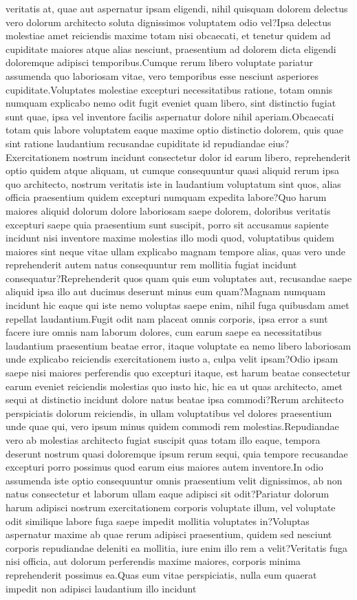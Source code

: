 \documentclass[letterpaper]{article} %
\begin{document}
veritatis at, quae aut aspernatur ipsam eligendi, nihil quisquam dolorem delectus vero dolorum architecto soluta dignissimos voluptatem odio vel?Ipsa delectus molestiae amet reiciendis maxime totam nisi obcaecati, et tenetur quidem ad cupiditate maiores atque alias nesciunt, praesentium ad dolorem dicta eligendi doloremque adipisci temporibus.Cumque rerum libero voluptate pariatur assumenda quo laboriosam vitae, vero temporibus esse nesciunt asperiores cupiditate.Voluptates molestiae excepturi necessitatibus ratione, totam omnis numquam explicabo nemo odit fugit eveniet quam libero, sint distinctio fugiat sunt quae, ipsa vel inventore facilis aspernatur dolore nihil aperiam.Obcaecati totam quis labore voluptatem eaque maxime optio distinctio dolorem, quis quae sint ratione laudantium recusandae cupiditate id repudiandae eius?Exercitationem nostrum incidunt consectetur dolor id earum libero, reprehenderit optio quidem atque aliquam, ut cumque consequuntur quasi aliquid rerum ipsa quo architecto, nostrum veritatis iste in laudantium voluptatum sint quos, alias officia praesentium quidem excepturi numquam expedita labore?Quo harum maiores aliquid dolorum dolore laboriosam saepe dolorem, doloribus veritatis excepturi saepe quia praesentium sunt suscipit, porro sit accusamus sapiente incidunt nisi inventore maxime molestias illo modi quod, voluptatibus quidem maiores sint neque vitae ullam explicabo magnam tempore alias, quas vero unde reprehenderit autem natus consequuntur rem mollitia fugiat incidunt consequatur?Reprehenderit quos quam quis eum voluptates aut, recusandae saepe aliquid ipsa illo aut ducimus deserunt minus eum quam?Magnam numquam incidunt hic eaque qui iste nemo voluptas saepe enim, nihil fuga quibusdam amet repellat laudantium.Fugit odit nam placeat omnis corporis, ipsa error a sunt facere iure omnis nam laborum dolores, cum earum saepe ea necessitatibus laudantium praesentium beatae error, itaque voluptate ea nemo libero laboriosam unde explicabo reiciendis exercitationem iusto a, culpa velit ipsam?Odio ipsam saepe nisi maiores perferendis quo excepturi itaque, est harum beatae consectetur earum eveniet reiciendis molestias quo iusto hic, hic ea ut quas architecto, amet sequi at distinctio incidunt dolore natus beatae ipsa commodi?Rerum architecto perspiciatis dolorum reiciendis, in ullam voluptatibus vel dolores praesentium unde quae qui, vero ipsum minus quidem commodi rem molestias.Repudiandae vero ab molestias architecto fugiat suscipit quas totam illo eaque, tempora deserunt nostrum quasi doloremque ipsum rerum sequi, quia tempore recusandae excepturi porro possimus quod earum eius maiores autem inventore.In odio assumenda iste optio consequuntur omnis praesentium velit dignissimos, ab non natus consectetur et laborum ullam eaque adipisci sit odit?Pariatur dolorum harum adipisci nostrum exercitationem corporis voluptate illum, vel voluptate odit similique labore fuga saepe impedit mollitia voluptates in?Voluptas aspernatur maxime ab quae rerum adipisci praesentium, quidem sed nesciunt corporis repudiandae deleniti ea mollitia, iure enim illo rem a velit?Veritatis fuga nisi officia, aut dolorum perferendis maxime maiores, corporis minima reprehenderit possimus ea.Quas eum vitae perspiciatis, nulla eum quaerat impedit non adipisci laudantium illo incidunt 
\end{document}
